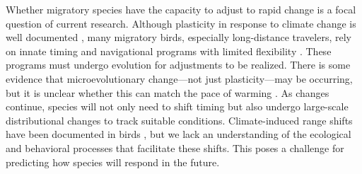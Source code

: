 \documentclass[a4paper, nobind]{templates/ociamthesis}
\begin{document}
Whether migratory species have the capacity to adjust to rapid change is a focal question of current research. Although plasticity in response to climate change is well documented \autocite{gienappResponsesClimateChange2007,usuiTemporalShiftsTemperature2017}, many migratory birds, especially long-distance travelers, rely on innate timing and navigational programs with limited flexibility \autocite{akessonTimingAvianLongdistance2017,gwinnerCircannualClocksAvian1996}. These programs must undergo evolution for adjustments to be realized. There is some evidence that microevolutionary change---not just plasticity---may be occurring, but it is unclear whether this can match the pace of warming \autocites[Chapter \ref{flycatchers}:][]{helmEvolutionaryResponseClimate2019}{vanbuskirkPhenotypicPlasticityAlone2012}{charmantierClimateChangeTiming2014}{merilaClimateChangeAdaptation2014}. As changes continue, species will not only need to shift timing but also undergo large-scale distributional changes to track suitable conditions. Climate-induced range shifts have been documented in birds \autocite{ambrosiniClimateChangeLongterm2011,lehikoinenNorthNorthwestClimate2016,lasortePolewardShiftsWinter2007,tingleyPushPullClimate2012}, but we lack an understanding of the ecological and behavioral processes that facilitate these shifts. This poses a challenge for predicting how species will respond in the future.
\end{document}
